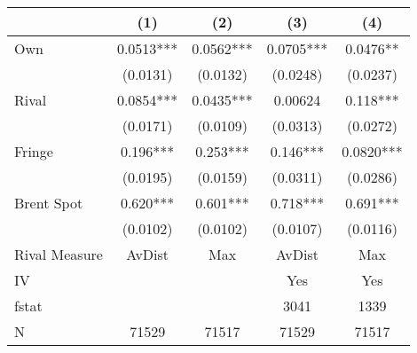 {
\def\sym#1{\ifmmode^{#1}\else\(^{#1}\)\fi}
\begin{tabular}{l*{4}{c}}
\toprule
                &\multicolumn{1}{c}{(1)}   &\multicolumn{1}{c}{(2)}   &\multicolumn{1}{c}{(3)}   &\multicolumn{1}{c}{(4)}   \\
\midrule
Own             &   0.0513***&   0.0562***&   0.0705***&   0.0476** \\
                & (0.0131)   & (0.0132)   & (0.0248)   & (0.0237)   \\
\addlinespace
Rival           &   0.0854***&   0.0435***&  0.00624   &    0.118***\\
                & (0.0171)   & (0.0109)   & (0.0313)   & (0.0272)   \\
\addlinespace
Fringe          &    0.196***&    0.253***&    0.146***&   0.0820***\\
                & (0.0195)   & (0.0159)   & (0.0311)   & (0.0286)   \\
\addlinespace
Brent Spot      &    0.620***&    0.601***&    0.718***&    0.691***\\
                & (0.0102)   & (0.0102)   & (0.0107)   & (0.0116)   \\
\midrule
Rival Measure   &   AvDist   &      Max   &   AvDist   &      Max   \\
IV              &            &            &      Yes   &      Yes   \\
fstat           &            &            &     3041   &     1339   \\
N               &    71529   &    71517   &    71529   &    71517   \\
\bottomrule
\end{tabular}
}
